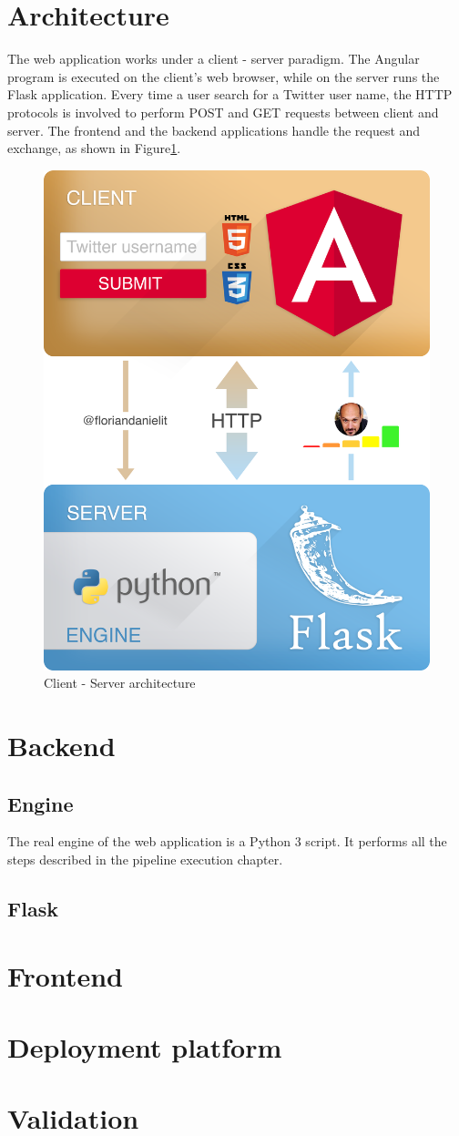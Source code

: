 \section{Architecture}
The web application works under a client - server paradigm. The Angular program is executed on the client's web browser, while on the server runs the Flask application.
Every time a user search for a Twitter user name, the HTTP protocols is involved to perform POST and GET requests between client and server. The frontend and the backend applications handle the request and exchange, as shown in Figure\ref{fig:architecture}.
\begin{figure}
	\begin{center}
		\includegraphics[width=0.6\columnwidth]{chapter6/figure/architecture.png}\par 
	\end{center}
	\caption{Client - Server architecture}
	\label{fig:architecture}
\end{figure}

\section{Backend}
\subsection{Engine}
The real engine of the web application is a Python 3 script. It performs all the steps described in the pipeline execution chapter.
\subsection{Flask}
\section{Frontend}
\section{Deployment platform}
\section{Validation}
